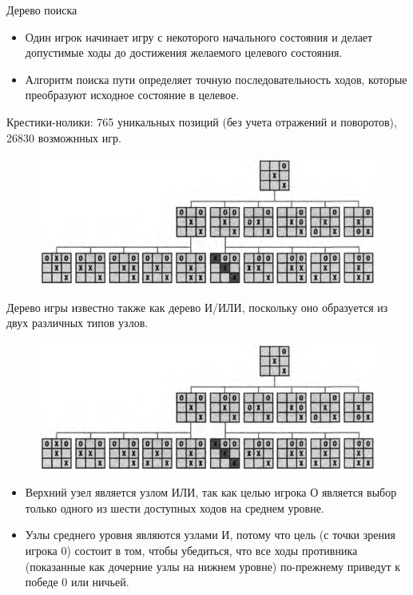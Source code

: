 \documentclass{beamer}
\begin{document}
\begin{frame}
\begin{block}{Дерево поиска}
\begin{itemize}
\item Один игрок начинает игру с некоторого начального состояния и делает допустимые ходы до достижения желаемого целевого состояния. 
\item Алгоритм поиска пути определяет точную последовательность ходов, которые преобразуют исходное состояние в целевое.
\end{itemize}
\end{block}
Крестики-нолики: 765 уникальных позиций (без учета отражений и поворотов), 26830 возможнных игр.
\begin{figure}[h]
\centering
\includegraphics[scale=0.5]{images/lec05-pic01.png}
\end{figure}
\end{frame}

\begin{frame}
Дерево игры известно также как дерево И/ИЛИ, поскольку оно образуется из
двух различных типов узлов.
\begin{figure}[h]
\centering
\includegraphics[scale=0.5]{images/lec05-pic01.png}
\end{figure}
\begin{itemize}
\item Верхний узел является узлом ИЛИ, так как целью игрока О является выбор только одного из шести доступных ходов на среднем уровне.
\item Узлы среднего уровня являются узлами И, потому что цель (с точки зрения игрока 0)
состоит в том, чтобы убедиться, что все ходы противника (показанные как дочерние
узлы на нижнем уровне) по-прежнему приведут к победе 0 или ничьей. 
\end{itemize}
\end{frame}
\end{document}
